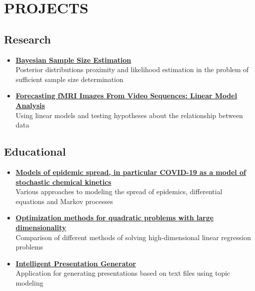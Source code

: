 \documentclass[12pt]{moderncv}
\begin{document}
    \section{PROJECTS}

        \subsection{Research}

        \begin{itemize}
            \item \href{https://github.com/kisnikser/Bayesian-Sample-Size-Estimation}{\textbf{Bayesian Sample Size Estimation}}\\
            Posterior distributions proximity and likelihood estimation in the problem of
            sufficient sample size determination
            \item \href{https://github.com/intsystems/2023-Project-112}{\textbf{Forecasting fMRI Images From Video Sequences: Linear Model Analysis}}\\
            Using linear models and testing hypotheses about the relationship between data
        \end{itemize}

        \subsection{Educational}

        \begin{itemize}
            \item \href{https://github.com/kisnikser/Epidemic-Spread-Models}{\textbf{Models of epidemic spread, in particular COVID-19 as a model of stochastic chemical kinetics}}\\
            Various approaches to modeling the spread of epidemics, differential equations and Markov processes
            \item \href{https://github.com/kisnikser/Optimization-Methods}{\textbf{Optimization methods for quadratic problems with large dimensionality}}\\
            Comparison of different methods of solving high-dimensional linear regression problems
            \item \href{https://github.com/kisnikser/Intelligent-Presentation-Generator}{\textbf{Intelligent Presentation Generator}}\\
            Application for generating presentations based on text files using topic modeling
        \end{itemize}
\end{document}
